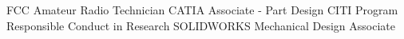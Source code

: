 \documentclass[../Resume]{subfiles}
\begin{document}

    \Entry FCC Amateur Radio Technician
    \Entry CATIA Associate - Part Design
    \Entry CITI Program Responsible Conduct in Research
    \Entry SOLIDWORKS Mechanical Design Associate
\end{document}

